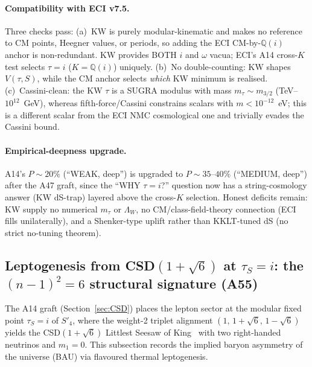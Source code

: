 \documentclass[a4paper,11pt]{article}
\newcommand{\Spf}{S'_4}
\newcommand{\Qi}{\mathbb{Q}(i)}
\theoremstyle{definition}
\theoremstyle{remark}
\begin{document}
\paragraph{Compatibility with ECI v7.5.}  Three checks pass:
(a)~KW is purely modular-kinematic and makes no reference to
CM points, Heegner values, or periods, so adding the ECI
CM-by-$\Qi$ anchor is non-redundant.  KW provides BOTH $i$ and
$\omega$ vacua; ECI's A14 cross-$K$ test selects $\tau=i$
($K=\Qi$) uniquely.  (b)~No double-counting: KW shapes
$V(\tau,S)$, while the CM anchor selects \emph{which} KW
minimum is realised.  (c)~Cassini-clean: the KW $\tau$ is a
SUGRA modulus with mass $m_\tau\sim m_{3/2}$
(TeV--$10^{12}$~GeV), whereas fifth-force/Cassini constrains
scalars with $m<10^{-12}$~eV; this is a different scalar from
the ECI NMC cosmological one and trivially evades the Cassini
bound.

\paragraph{Empirical-deepness upgrade.}  A14's
$P\sim 20\%$ (``WEAK, deep'') is upgraded to
$P\sim 35$--$40\%$ (``MEDIUM, deep'') after the A47 graft,
since the ``WHY $\tau=i$?'' question now has a string-cosmology
answer (KW dS-trap) layered above the cross-$K$ selection.
Honest deficits remain: KW supply no numerical $m_\tau$ or
$\Lambda_W$, no CM/class-field-theory connection
(ECI fills unilaterally), and a Shenker-type uplift rather than
KKLT-tuned dS (no strict no-tuning theorem).

\subsection{Leptogenesis from CSD$(1+\sqrt 6)$ at
            $\tau_S=i$: the $(n-1)^2=6$ structural
            signature (A55)}
\label{sec:lepto}

The A14 graft (Section~\ref{sec:CSD}) places the lepton sector
at the modular fixed point $\tau_S=i$ of $\Spf$, where the
weight-2 triplet alignment $(1,\,1+\sqrt 6,\,1-\sqrt 6)$ yields
the CSD$(1+\sqrt 6)$ Littlest Seesaw of King~\cite{LMS22,LS16}
with two right-handed neutrinos and $m_1=0$.  This subsection
records the implied baryon asymmetry of the universe (BAU) via
flavoured thermal leptogenesis.
\end{document}
